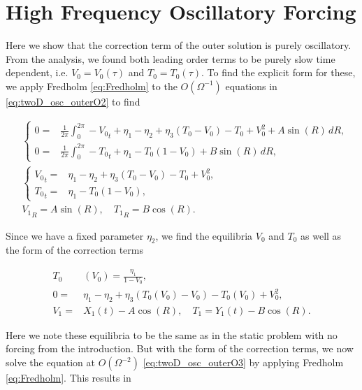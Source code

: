 \section*{High Frequency Oscillatory Forcing}

Here we show that the correction term of the outer solution is purely oscillatory. From the analysis, we found both leading order terms to be purely slow time dependent, i.e. $V_0=V_0(\tau)$ and $T_0=T_0(\tau)$. To find the explicit form for these, we apply Fredholm \eqref{eq:Fredholm} to the $O(\Omega^{-1})$ equations in \eqref{eq:twoD_osc_outerO2} to find

\begin{equation}\label{eq:twoD_app_osc1}
\begin{aligned}
&\begin{cases}
	0 = & \frac{1}{2\pi}\int_0^{2\pi}-{V_0}_t+\eta_1-\eta_2+\eta_3(T_0-V_0)-T_0+V_0^2+A\sin(R)\,dR,\\
	 0 =& \frac{1}{2\pi}\int_0^{2\pi}-{T_0}_t+ \eta_1-T_0(1-V_0)+B\sin(R)\,dR,
\end{cases}\\
&\begin{cases}
	{V_0}_t = & \eta_1-\eta_2+\eta_3(T_0-V_0)-T_0+V_0^2,\\
	 {T_0}_t =&  \eta_1-T_0(1-V_0),
\end{cases}\\
& {V_1}_R = A\sin(R),\quad {T_1}_R = B\cos(R).
\end{aligned}
\end{equation}

Since we have a fixed parameter $\eta_2$, we find the equilibria $V_0$ and $T_0$ as well as the form of the correction terms

\begin{equation*}
\begin{aligned}
T_0&(V_0) = \frac{\eta_1}{1-V_0},\\
0= & \eta_1-\eta_2 +\eta_3(T_0(V_0)-V_0)-T_0(V_0)+V_0^2,\\
V_1 =& X_1(t)-A\cos(R),  \quad T_1 = Y_1(t)-B\cos(R).
\end{aligned}
\end{equation*}

Here we note these equilibria to be the same as in the static problem with no forcing from the introduction. But with the form of the correction terms, we now solve the equation at $O(\Omega^{-2})$ \eqref{eq:twoD_osc_outerO3} by applying Fredholm \eqref{eq:Fredholm}. This results in


